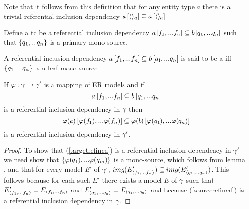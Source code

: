 Note that it follows from this definition that for any entity type $a$ there is a trivial referential inclusion dependency $
a\left[\langle\rangle_a\right]\subseteq a\left[\langle\rangle_a\right]$

\begin{definition}
Define a  to be a
referential inclusion dependency $a\left[f_1,...f_n\right]\subseteq b\left[q_1,...q_n\right]$
such that $\left\{q_1,...q_n\right\}$ is a primary mono-source.
\end{definition}

\begin{definition} 
A referential inclusion dependency $a\left[f_1,...f_n\right]\subseteq b\left[q_1,...q_n\right]$ is said to be a  iff $\left\{q_1,...q_n\right\}$ is a leaf mono source. 
\end{definition}

\begin{lemma}
If $\varphi: \gamma \rightarrow \gamma'$ is a mapping of ER models and
if 
\begin{equation}
\label{sourcerefincd}
a\left[f_1,...f_n\right]\subseteq b\left[q_1,...q_n\right]
\end{equation}
is a referential inclusion dependency in $\gamma$ then  
\begin{equation}
\label{targetrefincd}
\varphi(a)\left[\varphi(f_1),...\varphi(f_n)\right]\subseteq\varphi(b)\left[\varphi(q_1),...\varphi(q_n)\right]
\end{equation}
is a referential inclusion dependency in $\gamma'$. 

\end{lemma}
\begin{proof}
To show that (\ref{targetrefincd}) is a referential inclusion dependency
 in $\gamma'$ we need show that $\left\{\varphi(q_1),...\varphi(q_m)\right\}$ is a mono-source, which follows from lemma , and that for every model $E'$ of $\gamma'$, 
$img(E'_{\langle f_1,...f_n\rangle}) \subseteq img(E'_{\langle q_1,...q_n\rangle})$. 
This follows because for each such $E'$ there exists a model $E$ of $\gamma$ such that 
$E'_{\langle f_1,...f_n\rangle}=E_{\langle f_1,...f_n\rangle}$ and $E'_{\langle q_1,...q_n\rangle}=E_{\langle q_1,...q_n\rangle}$ and because
(\ref{sourcerefincd}) is a referential inclusion dependency in $\gamma$.

\end{proof}

